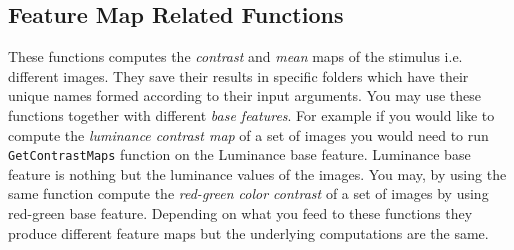 \documentclass[a4paper,10pt]{report}
\begin{document}
\subsection{Feature Map Related Functions}

These functions computes the \textit{contrast} and \textit{mean} maps of the stimulus i.e. different images. They save their results in specific folders which have their unique names formed according to their input arguments. You may use these functions together with different \textit{base features}. For example if you would like to compute the \textit{luminance contrast map} of a set of images you would need to run \texttt{GetContrastMaps} function on the Luminance base feature. Luminance base feature is nothing but the luminance values of the images. You may, by using the same function compute the \textit{red-green color contrast} of a set of images by using red-green base feature. Depending on what you feed to these functions they produce different feature maps but the underlying computations are the same.
\end{document}
